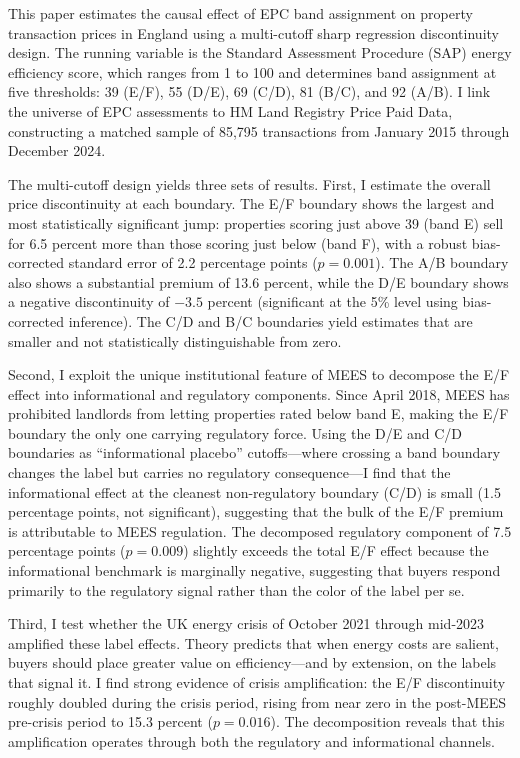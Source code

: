 \documentclass[12pt]{article}
\begin{document}
This paper estimates the causal effect of EPC band assignment on property transaction prices in England using a multi-cutoff sharp regression discontinuity design. The running variable is the Standard Assessment Procedure (SAP) energy efficiency score, which ranges from 1 to 100 and determines band assignment at five thresholds: 39 (E/F), 55 (D/E), 69 (C/D), 81 (B/C), and 92 (A/B). I link the universe of EPC assessments to HM Land Registry Price Paid Data, constructing a matched sample of 85,795 transactions from January 2015 through December 2024.

The multi-cutoff design yields three sets of results. First, I estimate the overall price discontinuity at each boundary. The E/F boundary shows the largest and most statistically significant jump: properties scoring just above 39 (band E) sell for 6.5 percent more than those scoring just below (band F), with a robust bias-corrected standard error of 2.2 percentage points ($p = 0.001$). The A/B boundary also shows a substantial premium of 13.6 percent, while the D/E boundary shows a negative discontinuity of $-3.5$ percent (significant at the 5\% level using bias-corrected inference). The C/D and B/C boundaries yield estimates that are smaller and not statistically distinguishable from zero.

Second, I exploit the unique institutional feature of MEES to decompose the E/F effect into informational and regulatory components. Since April 2018, MEES has prohibited landlords from letting properties rated below band E, making the E/F boundary the only one carrying regulatory force. Using the D/E and C/D boundaries as ``informational placebo'' cutoffs---where crossing a band boundary changes the label but carries no regulatory consequence---I find that the informational effect at the cleanest non-regulatory boundary (C/D) is small (1.5 percentage points, not significant), suggesting that the bulk of the E/F premium is attributable to MEES regulation. The decomposed regulatory component of 7.5 percentage points ($p = 0.009$) slightly exceeds the total E/F effect because the informational benchmark is marginally negative, suggesting that buyers respond primarily to the regulatory signal rather than the color of the label per se.

Third, I test whether the UK energy crisis of October 2021 through mid-2023 amplified these label effects. Theory predicts that when energy costs are salient, buyers should place greater value on efficiency---and by extension, on the labels that signal it. I find strong evidence of crisis amplification: the E/F discontinuity roughly doubled during the crisis period, rising from near zero in the post-MEES pre-crisis period to 15.3 percent ($p = 0.016$). The decomposition reveals that this amplification operates through both the regulatory and informational channels.
\end{document}
